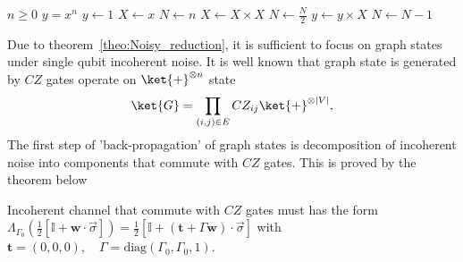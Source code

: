 \documentclass[aps]{revtex4-2}%
\begin{document}
\begin{algorithm}
\caption{An algorithm with caption}\label{alg:cap}
\begin{algorithmic}
\Require $n \geq 0$
\Ensure $y = x^n$
\State $y \gets 1$
\State $X \gets x$
\State $N \gets n$
    \State $X \gets X \times X$
    \State $N \gets \frac{N}{2}$  
    \State $y \gets y \times X$
    \State $N \gets N - 1$
\EndIf
\EndWhile
\end{algorithmic}
\end{algorithm}

Due to theorem~\ref{theo:Noisy_reduction},  it is sufficient to focus on graph states under single qubit incoherent noise. It is well known that graph state is generated by $CZ$ gates operate on $\ket{+}^{\otimes n}$ state
\begin{align}
\ket{G} = \prod_{(i,j) \in E} CZ_{ij} \ket{+}^{\otimes |V|},    
\end{align}
The first step of 'back-propagation' of graph states is decomposition of incoherent noise into components that commute with $CZ$ gates. This is proved by the theorem below
\begin{lemma}\label{lemma:commute_channel}
    Incoherent channel that commute with $CZ$ gates must has the form   \(\Lambda_{\Gamma_0}\left(\frac{1}{2}[\mathbb{I} + \mathbf{w} \cdot  \vec\sigma]\right) = \frac{1}{2}[\mathbb{I} + (\mathbf{t} + \Gamma\mathbf{w}) \cdot  \vec\sigma]\) with $\mathbf{t} = (0,0,0), \quad  \Gamma = \text{diag}(\Gamma_0,\Gamma_0,1)$. 
\end{lemma}
\end{document}
